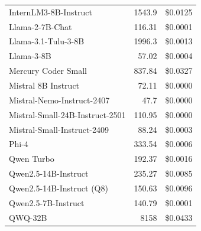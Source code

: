 \documentclass[11pt]{article}
\begin{document}
\begin{table}[htbp]
{\begin{tabular}{lrr}
InternLM3-8B-Instruct & 1543.9 & \$0.0125 \\
Llama-2-7B-Chat & 116.31 & \$0.0001 \\
Llama-3.1-Tulu-3-8B & 1996.3 & \$0.0013 \\
Llama-3-8B & 57.02 & \$0.0004 \\
Mercury Coder Small & 837.84 & \$0.0327 \\
Mistral 8B Instruct & 72.11 & \$0.0000 \\
Mistral-Nemo-Instruct-2407 & 47.7 & \$0.0000 \\
Mistral-Small-24B-Instruct-2501 & 110.95 & \$0.0000 \\
Mistral-Small-Instruct-2409 & 88.24 & \$0.0003 \\
Phi-4 & 333.54 & \$0.0006 \\
Qwen Turbo & 192.37 & \$0.0016 \\
Qwen2.5-14B-Instruct & 235.27 & \$0.0085 \\
Qwen2.5-14B-Instruct (Q8) & 150.63 & \$0.0096 \\
Qwen2.5-7B-Instruct & 140.79 & \$0.0001 \\
QWQ-32B & 8158 & \$0.0433 \\
\bottomrule
\end{tabular}
}
\end{table}
\end{document}
